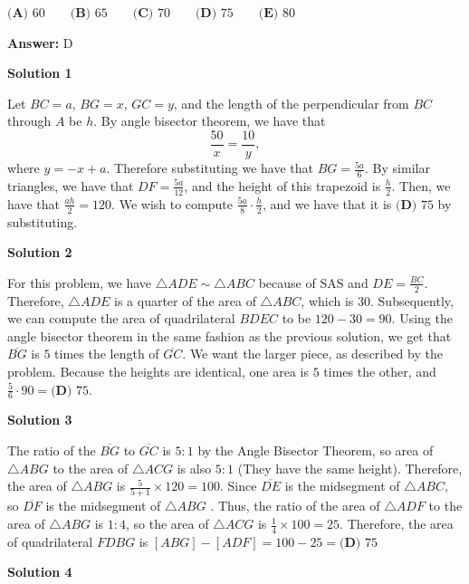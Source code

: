 \begin{enumerate}
 $\textbf{(A) }60 \qquad \textbf{(B) }65 \qquad \textbf{(C) }70 \qquad \textbf{(D) }75 \qquad \textbf{(E) }80 \qquad$

 \textbf{Answer: }D



\textbf{Solution 1}

Let $BC = a$, $BG = x$, $GC = y$, and the length of the perpendicular from $BC$ through $A$ be $h$. By angle bisector theorem, we have that 
 \[\frac{50}{x} = \frac{10}{y},\] where $y = -x+a$. Therefore substituting we have that $BG=\frac{5a}{6}$. By similar triangles, we have that $DF=\frac{5a}{12}$, and the height of this trapezoid is $\frac{h}{2}$. Then, we have that $\frac{ah}{2}=120$. We wish to compute $\frac{5a}{8}\cdot\frac{h}{2}$, and we have that it is $\boxed{\textbf{(D) }75}$ by substituting.

 



\textbf{Solution 2}

For this problem, we have $\triangle{ADE}\sim\triangle{ABC}$ because of SAS and $DE = \frac{BC}{2}$. Therefore, $\bigtriangleup ADE$ is a quarter of the area of $\bigtriangleup ABC$, which is $30$. Subsequently, we can compute the area of quadrilateral $BDEC$ to be $120 - 30 = 90$. Using the angle bisector theorem in the same fashion as the previous solution, we get that $\overline{BG}$ is $5$ times the length of $\overline{GC}$. We want the larger piece, as described by the problem. Because the heights are identical, one area is $5$ times the other, and $\frac{5}{6} \cdot 90 = \boxed{\textbf{(D) }75}$.

 



\textbf{Solution 3}

The ratio of the $\overline{BG}$ to $\overline{GC}$ is $5:1$ by the Angle Bisector Theorem, so area of $\bigtriangleup ABG$ to the area of $\bigtriangleup ACG$ is also $5:1$ (They have the same height). Therefore, the area of $\bigtriangleup ABG$ is $\frac{5}{5+1}\times120=100$. Since $\overline{DE}$ is the midsegment of $\bigtriangleup ABC$, so $\overline{DF}$ is the midsegment of $\bigtriangleup ABG$ . Thus, the ratio of the area of $\bigtriangleup ADF$ to the area of $\bigtriangleup ABG$ is $1:4$, so the area of $\bigtriangleup ACG$ is $\frac{1}{4}\times100=25$. Therefore, the area of quadrilateral $FDBG$ is $[ABG]-[ADF]=100-25=\boxed{\textbf{(D) }75}$




\textbf{Solution 4}


\end{enumerate}
